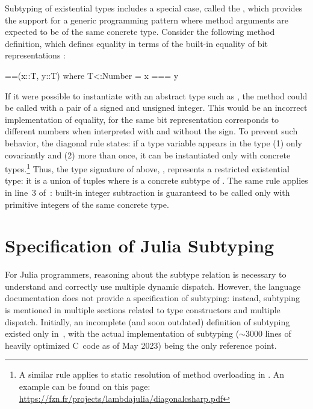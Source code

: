 Subtyping of existential types includes a special case, called 
the , which provides the support for
a generic programming pattern where method arguments are expected
to be of the same concrete type.
Consider the following method definition, which defines equality
\cjl{(==)} in terms of the built-in equality of bit representations \cjl{(===)}:
\begin{codeenvd}
\begin{julia}
==(x::T, y::T) where T<:Number = x === y
\end{julia}
\end{codeenvd}
If it were possible to instantiate  with an abstract type such as
, the method could be called with a pair of a signed and unsigned
integer. This would be an incorrect implementation of equality, for the same bit
representation corresponds to different numbers when interpreted with and
without the sign.
To prevent such behavior, the diagonal rule states: if a type variable
appears in the type (1) only covariantly and (2) more than once,
it can be instantiated
only with concrete types.\footnote{A similar rule applies to static resolution
of method overloading in \CSharp. An example can be found on this page:
\href{https://fzn.fr/projects/lambdajulia/diagonalcsharp.pdf}{https://fzn.fr/projects/lambdajulia/diagonalcsharp.pdf}}
Thus, the type signature of \cjl{(==)} above,
, represents a restricted existential type:
it is a union of tuples  where  is a concrete subtype
of . The same rule applies in line~3
of~: built-in integer subtraction  is
guaranteed to be called only with primitive integers of the same concrete type.

\section{Specification of Julia Subtyping}\label{sec:julia-sub:lambda-julia}

For Julia programmers, reasoning about the subtype relation is necessary
to understand and correctly use multiple dynamic dispatch.
However, the language documentation does not provide a specification
of subtyping: instead, subtyping is mentioned in multiple sections related to
type constructors and multiple dispatch.
Initially, an incomplete (and soon outdated) definition of subtyping existed 
only in~\cite{bib:bezanson:julia:2015}, with the actual implementation of 
subtyping ($\sim$3000 lines of heavily optimized C~code as of May 2023)
being the only reference point.

